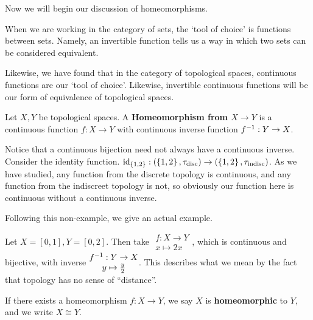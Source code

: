 \documentclass[12pt, twosided]{article}
\begin{document}
Now we will begin our discussion of homeomorphisms.

When we are working in the category of sets, the `tool of choice' is functions between sets. Namely, an invertible function tells us a way in which two sets can be considered equivalent.

Likewise, we have found that in the category of topological spaces, continuous functions are our `tool of choice'. Likewise, invertible continuous functions will be our form of equivalence of topological spaces.

\begin{df}
  Let \(X, Y\) be topological spaces. A \textbf{Homeomorphism from \(X \to Y\)} is a continuous function \(f: X \to Y\) with continuous inverse function \(f^{-1}:Y \to X\).
\end{df}

\begin{exa}
  Notice that a continuous bijection need not always have a continuous inverse. Consider the identity function. \(\mathrm{id}_{\{1, 2\}}:(\left\{ 1, 2 \right\}, \tau_{\mathrm{disc}}) \to (\left\{ 1, 2 \right\}, \tau_{\mathrm{indisc}})\). As we have studied, any function from the discrete topology is continuous, and any function from the indiscreet topology is not, so obviously our function here is continuous without a continuous inverse.
\end{exa}

Following this non-example, we give an actual example.

\begin{exa}
  Let \(X = [0, 1], Y = [0, 2]\). Then take \(
  \begin{matrix}
    f: X \to Y \\ x \mapsto 2x 
  \end{matrix} \), which is continuous and bijective, with inverse \(
  \begin{matrix}
    f^{-1}: Y \to X \\ y \mapsto \frac{y}{2}
  \end{matrix}\). This describes what we mean by the fact that topology has no sense of ``distance''.
\end{exa}

\begin{df}
  If there exists a homeomorphism \(f: X \to Y\), we say \(X\) is \textbf{homeomorphic} to \(Y\), and we write \(X \cong Y\).
\end{df}
\end{document}

